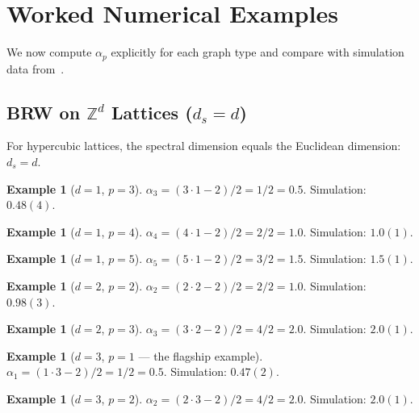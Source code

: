 \documentclass[11pt,a4paper]{article}
\theoremstyle{definition}
\newtheorem{example}[theorem]{Example}
\begin{document}
\section{Worked Numerical Examples}
\label{sec:examples}

We now compute $\alpha_p$ explicitly for each graph type and compare
with simulation data from~\cite{bordeu2019,amarteifio2019}.

\subsection{BRW on $\mathbb{Z}^d$ Lattices ($d_s = d$)}

For hypercubic lattices, the spectral dimension equals the Euclidean
dimension: $d_s = d$.

\begin{example}[$d = 1$, $p = 3$]
$\alpha_3 = (3 \cdot 1 - 2)/2 = 1/2 = 0.5$.
Simulation: $0.48(4)$. \checkmark
\end{example}

\begin{example}[$d = 1$, $p = 4$]
$\alpha_4 = (4 \cdot 1 - 2)/2 = 2/2 = 1.0$.
Simulation: $1.0(1)$. \checkmark
\end{example}

\begin{example}[$d = 1$, $p = 5$]
$\alpha_5 = (5 \cdot 1 - 2)/2 = 3/2 = 1.5$.
Simulation: $1.5(1)$. \checkmark
\end{example}

\begin{example}[$d = 2$, $p = 2$]
$\alpha_2 = (2 \cdot 2 - 2)/2 = 2/2 = 1.0$.
Simulation: $0.98(3)$. \checkmark
\end{example}

\begin{example}[$d = 2$, $p = 3$]
$\alpha_3 = (3 \cdot 2 - 2)/2 = 4/2 = 2.0$.
Simulation: $2.0(1)$. \checkmark
\end{example}

\begin{example}[$d = 3$, $p = 1$ --- the flagship example]
\label{ex:d3p1}
$\alpha_1 = (1 \cdot 3 - 2)/2 = 1/2 = 0.5$.
Simulation: $0.47(2)$. \checkmark
\end{example}

\begin{example}[$d = 3$, $p = 2$]
$\alpha_2 = (2 \cdot 3 - 2)/2 = 4/2 = 2.0$.
Simulation: $2.0(1)$. \checkmark
\end{example}
\end{document}
